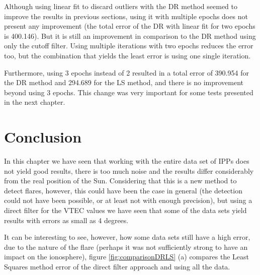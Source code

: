 Although using linear fit to discard outliers with the DR method seemed to improve the results in previous sections, using it with multiple epochs does not present any improvement (the total error of the DR with linear fit for two epochs is 400.146). But it is still an improvement in comparison to the DR method using only the cutoff filter. Using multiple iterations with two epochs reduces the error too, but the combination that yields the least error is using one single iteration.

Furthermore, using 3 epochs instead of 2 resulted in a total error of 390.954 for the DR method and 294.689 for the LS method, and there is no improvement beyond using 3 epochs. This change was very important for some tests presented in the next chapter.

\clearpage

\section{Conclusion}

In this chapter we have seen that working with the entire data set of IPPs does not yield good results, there is too much noise and the results differ considerably from the real position of the Sun. Considering that this is a new method to detect flares, however, this could have been the case in general (the detection could not have been possible, or at least not with enough precision), but using a direct filter for the VTEC values we have seen that some of the data sets yield results with errors as small as 4 degrees.

It can be interesting to see, however, how some data sets still have a high error, due to the nature of the flare (perhaps it was not sufficiently strong to have an impact on the ionosphere), figure \ref{fig:comparisonDRLS} (a) compares the Least Squares method error of the direct filter approach and using all the data.


